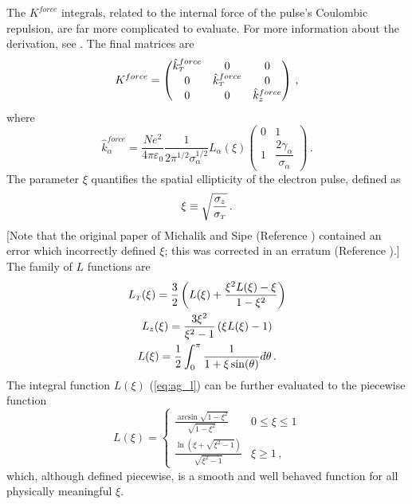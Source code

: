 The $K^{force}$ integrals, related to the internal force of the pulse's Coulombic repulsion, are far more complicated to evaluate.
For more information about the derivation, see \cite{michalik_analytic_2006}. %
The final matrices are
\begin{equation}
  K^{force} = 
  \begin{pmatrix}
    \hat{k}^{force}_{{\scriptscriptstyle T}} & 0 & 0 \\
    0 & \hat{k}^{force}_{{\scriptscriptstyle T}} & 0 \\
    0 & 0 & \hat{k}^{force}_{z}
  \end{pmatrix} \,\text{,}
\end{equation}
where
\begin{equation}
  \hat{k}^{force}_{\alpha} = 
  \frac{N e^2}{4\pi\varepsilon_0} \frac{1}{2\pi^{1/2}\sigma_{\alpha}^{1/2}} L_{\alpha}(\xi)
  \begin{pmatrix}
    0 & 1 \\
    1 & \dfrac{2 \gamma_{\alpha}}{\sigma_{\alpha}}
  \end{pmatrix} \,\text{.}
\end{equation}
The parameter $\xi$ quantifies the spatial ellipticity of the electron pulse, defined as
\begin{equation} \label{eq:define_xi}
  \xi \equiv \sqrt{\dfrac{\sigma_{z}}{\sigma_{{\scriptscriptstyle T}}}} \,\text{.}
\end{equation}
[Note that the original paper of Michalik and Sipe (Reference \cite{michalik_analytic_2006}) contained an error which incorrectly defined $\xi$; this was corrected in an erratum (Reference \cite{michalik_erratum:_2008}).]
The family of $L$ functions are
\begin{subequations}
  \begin{gather}
    L_{{\scriptscriptstyle T}}(\xi) = \frac{3}{2} \left( L(\xi) + \frac{\xi^2 L(\xi) - \xi}{ 1 - \xi^2 } \right) \\
    L_{z}(\xi) = \frac{ 3 \xi^2 }{ \xi^2 - 1} \left( \xi L(\xi) - 1 \right) \\
    L(\xi) = \frac{1}{2} \int_0^{\pi} \frac{1}{1+\xi\sin(\theta)} d\theta \,\text{.} \label{eq:ag_l}
  \end{gather}
\end{subequations}
The integral function $L(\xi)$ (\ref{eq:ag_l}) can be further evaluated to the piecewise function
\begin{equation}
  L(\xi) = 
  \begin{cases}
    \frac{ \arcsin \sqrt{1-\xi^2} }{ \sqrt{1-\xi^2} } & 0 \le \xi \le 1 \\
    \frac{ \ln\left( \xi + \sqrt{\xi^2 - 1} \right) }{ \sqrt{\xi^2 - 1} } & \xi \ge 1 \,\text{,}
  \end{cases}
\end{equation}
which, although defined piecewise, is a smooth and well behaved function for all physically meaningful $\xi$.

